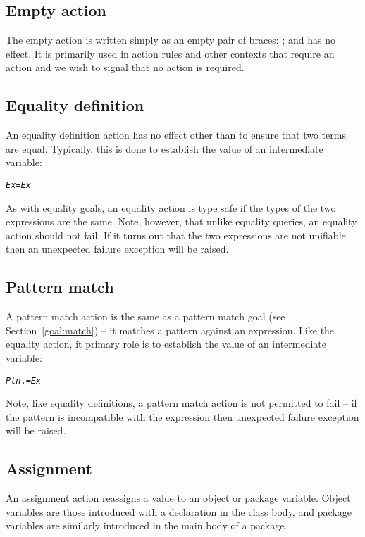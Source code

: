 \subsection{Empty action}
\label{action:empty}

The empty action is written simply as an empty pair of braces: \q{\{\}}; and has no effect. It is primarily used in action rules and other contexts that require an action and we wish to signal that no action is required.

\subsection{Equality definition}
\label{action:equality}

An equality definition action has no effect other than to ensure that two terms are equal. Typically, this is done to establish the value of an intermediate variable:
\begin{alltt}
\emph{Ex} = \emph{Ex}
\end{alltt}
As with equality goals, an equality action is type safe if the types of the two expressions are the same.  Note, however, that unlike equality queries, an equality action should not fail. If it turns out that the two expressions are not unifiable then an unexpected failure exception will be raised.

\subsection{Pattern match}
\label{action:match}

A pattern match action is the same as a pattern match goal (see Section~\vref{goal:match}) -- it matches a pattern against an expression. Like the equality action, it primary role is to establish the value of an intermediate variable:
\begin{alltt}
\emph{Ptn} .= \emph{Ex}
\end{alltt}
Note, like equality definitions, a pattern match action is not permitted to fail -- if the pattern is incompatible with the expression then unexpected failure exception will be raised.

\subsection{Assignment}
\label{action:assignment}
An assignment action reassigns a value to an object or package variable. Object variables are those introduced with a \q{:=} declaration in the class body, and package variables are similarly introduced in the main body of a package.

